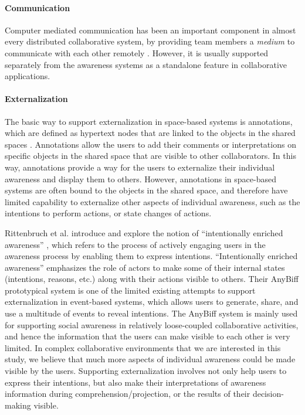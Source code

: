 \paragraph*{Communication} %
\label{par:communication}
Computer mediated communication has been an important component in almost every distributed collaborative system, by providing team members a \emph{medium} to communicate with each other remotely \cite{Gutwin2002}. However, it is usually supported separately from the awareness systems as a standalone feature in collaborative applications.

\paragraph*{Externalization} %
\label{par:externalization}
The basic way to support externalization in space-based systems is annotations, which are defined as hypertext nodes that are linked to the objects in the shared spaces \cite{Zheng2006,Weng2004}. Annotations allow the users to add their comments or interpretations on specific objects in the shared space that are visible to other collaborators. In this way, annotations provide a way for the users to externalize their individual awareness and display them to others. However, annotations in space-based systems are often bound to the objects in the shared space, and therefore have limited capability to externalize other aspects of individual awareness, such as the intentions to perform actions, or state changes of actions. 

Rittenbruch et al. introduce and explore the notion of ``intentionally enriched awareness'' \cite{Rittenbruch2007}, which refers to the process of actively engaging users in the awareness process by enabling them to express intentions. ``Intentionally enriched awareness'' emphasizes the role of actors to make some of their internal states (intentions, reasons, etc.) along with their actions visible to others. Their AnyBiff prototypical system is one of the limited existing attempts to support externalization in event-based systems, which allows users to generate, share, and use a multitude of events to reveal intentions. The AnyBiff system is mainly used for supporting social awareness in relatively loose-coupled collaborative activities, and hence the information that the users can make visible to each other is very limited. In complex collaborative environments that we are interested in this study, we believe that much more aspects of individual awareness could be made visible by the users. Supporting externalization involves not only help users to express their intentions, but also make their interpretations of awareness information during comprehension/projection, or the results of their decision-making visible.


